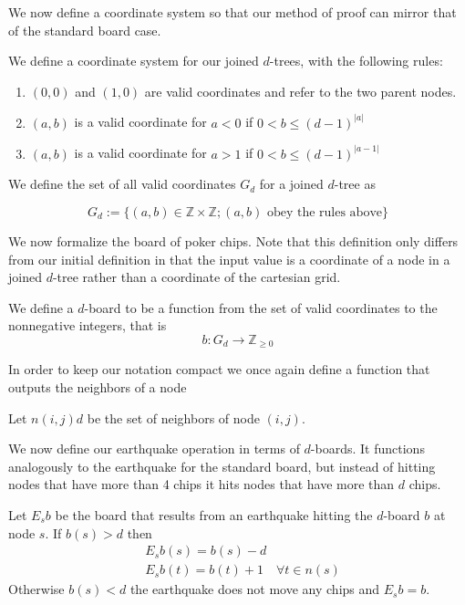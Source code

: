 \documentclass[runningheads,a4paper]{llncs}
\begin{document}
We now define a coordinate system so that our method of proof can mirror that of the standard board case.
\begin{definition} We define a coordinate system for our joined $d$-trees, with the following rules:
\begin{enumerate}
	\item $(0,0)$ and $(1,0)$ are valid coordinates and refer to the two parent nodes.
	\item $(a,b)$ is a valid coordinate for $a<0$ if $0<b \leq (d-1)^{|a|}$
	\item $(a,b)$ is a valid coordinate for $a>1$ if $0<b \leq (d-1)^{|a-1|}$
\end{enumerate}
We define the set of all valid coordinates $G_d$ for a joined $d$-tree as 
\end{definition}
\begin{equation*}
G_d:= \{ (a,b) \in \mathbb{Z} \times \mathbb{Z} ; (a,b) \text{ obey the rules above}\}
\end{equation*}


We now formalize the board of poker chips. Note that this definition only differs from our initial definition in that the input value is a coordinate of a node in a joined $d$-tree rather than a coordinate of the cartesian grid.
\begin{definition}
We define a $d$-board to be a function from the set of valid coordinates to the nonnegative integers, that is 
\begin{equation*}
b:  G_d \rightarrow \mathbb{Z}_{\geq 0}
\end{equation*}
\end{definition}

In order to keep our notation compact we once again define a function that outputs the neighbors of a node
\begin{definition} 
Let $n(i,j)d$ be the set of neighbors of node $(i,j)$.
\end{definition}

We now define our earthquake operation in terms of $d$-boards. It functions analogously to the earthquake for the standard board, but instead of hitting nodes that have more than 4 chips it hits nodes that have more than $d$ chips. 
\begin{definition}
Let $E_s b$ be the board that results from an earthquake hitting the $d$-board $b$ at node $s$. If $b(s)>d$ then 
\begin{align*}
&E_s b(s) = b(s)- d \\
&E_s b(t) = b(t) +1 \quad \forall t \in n(s)
\end{align*}
Otherwise $b(s)<d$ the earthquake does not move any chips and $E_s b=b$.
\end{definition}
\end{document}
